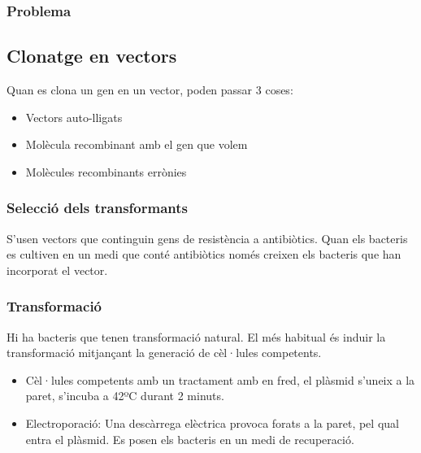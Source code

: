 \subsubsection*{Problema}


\subsection{Clonatge en vectors}
\label{sec:clonatge-en-vectors}
Quan es clona un gen en un vector, poden passar 3 coses:
\begin{itemize}
\item Vectors auto-lligats
\item Molècula recombinant amb el gen que volem
\item Molècules recombinants errònies
\end{itemize}

\subsubsection{Selecció dels transformants}
\label{sec:selecc-dels-transf}
S'usen vectors que continguin gens de resistència a antibiòtics. Quan els bacteris es cultiven en un medi que conté antibiòtics només creixen els bacteris que han incorporat el vector.

\subsubsection{Transformació}
\label{sec:transformacio}
Hi ha bacteris que tenen transformació natural. El més habitual és induir la transformació mitjançant la generació de cèl·lules competents.

\begin{itemize}
\item Cèl·lules competents amb un tractament amb  en fred, el plàsmid s'uneix a la paret, s'incuba a 42ºC durant 2 minuts.

\item Electroporació: Una descàrrega elèctrica provoca forats a la paret, pel qual entra el plàsmid. Es posen els bacteris en un medi de recuperació.
\end{itemize}
